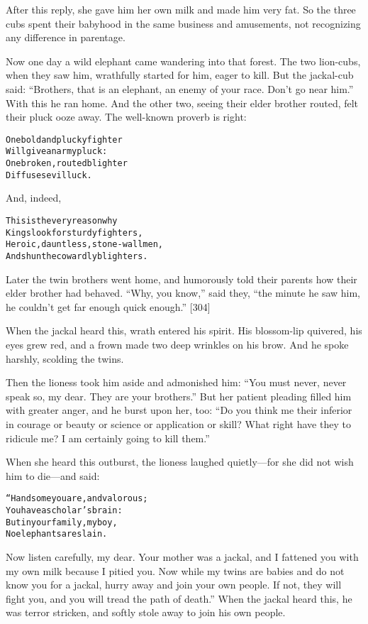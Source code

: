 \documentclass{article}
\renewenvironment{verbatim}{\begin{alltt}\normalfont\begin{centering}}{\end{centering}\end{alltt}}
\begin{document}
After this reply, she gave him her own milk and made him very fat.
So the three cubs spent their babyhood in the same business and
amusements, not recognizing any difference in parentage.

Now one day a wild elephant came wandering into that forest. The
two lion-cubs, when they saw him, wrathfully started for him, eager
to kill. But the jackal-cub said:
``Brothers, that is an elephant, an enemy of your race. Don't go near him.''
With this he ran home. And the other two, seeing their elder
brother routed, felt their pluck ooze away. The well-known proverb
is right:

\begin{verbatim}
One bold and plucky fighter
    Will give an army pluck:
One broken, routed blighter
    Diffuses evil luck.
\end{verbatim}
And, indeed,

\begin{verbatim}
This is the very reason why
    Kings look for sturdy fighters,
Heroic, dauntless, stone-wall men,
    And shun the cowardly blighters.
\end{verbatim}
Later the twin brothers went home, and humorously told their
parents how their elder brother had behaved. ``Why, you know,''
said they,
``the minute he saw him, he couldn't get far enough quick enough.''
[304]

When the jackal heard this, wrath entered his spirit. His
blossom-lip quivered, his eyes grew red, and a frown made two deep
wrinkles on his brow. And he spoke harshly, scolding the twins.

Then the lioness took him aside and admonished him:
``You must never, never speak so, my dear. They are your brothers.''
But her patient pleading filled him with greater anger, and he
burst upon her, too:
``Do you think me their inferior in courage or beauty or science or application or skill? What right have they to ridicule me? I am certainly going to kill them.''

When she heard this outburst, the lioness laughed quietly---for she
did not wish him to die---and said:

\begin{verbatim}
“Handsome you are, and valorous;
    You have a scholar's brain:
But in your family, my boy,
    No elephants are slain.
\end{verbatim}
Now listen carefully, my dear. Your mother was a jackal, and I
fattened you with my own milk because I pitied you. Now while my
twins are babies and do not know you for a jackal, hurry away and
join your own people. If not, they will fight you, and you will
tread the path of death.” When the jackal heard this, he was terror
stricken, and softly stole away to join his own people.
\end{document}
